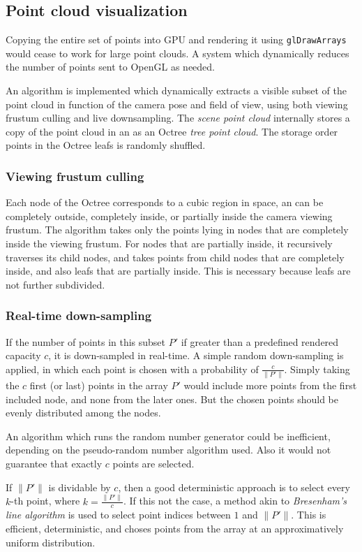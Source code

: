 \subsection{Point cloud visualization}
Copying the entire set of points into GPU and rendering it using \texttt{glDrawArrays} would cease to work for large point clouds. A system which dynamically reduces the number of points sent to OpenGL as needed.

An algorithm is implemented which dynamically extracts a visible subset of the point cloud in function of the camera pose and field of view, using both viewing frustum culling and live downsampling. The \emph{scene point cloud} internally stores a copy of the point cloud in an as an Octree \emph{tree point cloud}. The storage order points in the Octree leafs is randomly shuffled.

\subsubsection{Viewing frustum culling}
Each node of the Octree corresponds to a cubic region in space, an can be completely outside, completely inside, or partially inside the camera viewing frustum. The algorithm takes only the points lying in nodes that are completely inside the viewing frustum. For nodes that are partially inside, it recursively traverses its child nodes, and takes points from child nodes that are completely inside, and also leafs that are partially inside. This is necessary because leafs are not further subdivided.

\subsubsection{Real-time down-sampling}
If the number of points in this subset $P'$ if greater than a predefined rendered capacity $c$, it is down-sampled in real-time. A simple random down-sampling is applied, in which each point is chosen with a probability of $\frac{c}{\| P' \|}$. Simply taking the $c$ first (or last) points in the array $P'$ would include more points from the first included node, and none from the later ones. But the chosen points should be evenly distributed among the nodes.

An algorithm which runs the random number generator could be inefficient, depending on the pseudo-random number algorithm used. Also it would not guarantee that exactly $c$ points are selected.

If $\| P' \|$ is dividable by $c$, then a good deterministic approach is to select every $k$-th point, where $k = \frac{\| P' \|}{c}$. If this not the case, a method akin to \emph{Bresenham's line algorithm} is used to select point indices between $1$ and $\|P'\|$. This is efficient, deterministic, and choses points from the array at an approximatively uniform distribution.

